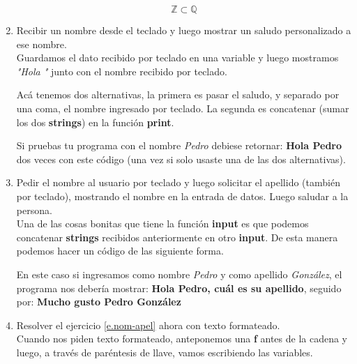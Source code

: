 \begin{enumerate}[{Ejercicio} 1.]
        \[\mathbb{Z} \subset \mathbb{Q} \]

        \item Recibir un nombre desde el teclado y luego mostrar un saludo personalizado a ese nombre. \\
        
        \asw Guardamos el dato recibido por teclado en una variable y luego mostramos \textit{"Hola "} junto con el nombre recibido por teclado.

        Acá tenemos dos alternativas, la primera es pasar el saludo, y separado por una coma, el nombre ingresado por teclado. La segunda es concatenar (sumar los dos \textbf{strings}) en la función \textbf{print}.\\


        Si pruebas tu programa con el nombre \textit{Pedro} debiese retornar: \textbf{Hola Pedro} dos veces con este código (una vez si solo usaste una de las dos alternativas).

        \item Pedir el nombre al usuario por teclado y luego solicitar el apellido (también por teclado), mostrando el nombre en la entrada de datos. Luego saludar a la persona.\label{e.nom-apel}\\
        
        \asw Una de las cosas bonitas que tiene la función \textbf{input} es que podemos concatenar \textbf{strings} recibidos anteriormente en otro \textbf{input}. De esta manera podemos hacer un código de las siguiente forma.\\

        \begin{listing}[H]
        \end{listing}

        En este caso si ingresamos como nombre \textit{Pedro} y como apellido \textit{González}, el programa nos debería mostrar: \textbf{Hola Pedro, cuál es su apellido}, seguido por: \textbf{Mucho gusto Pedro González}

        \item Resolver el ejercicio \ref{e.nom-apel} ahora con texto formateado.\label{e.formato}\\
        
        \asw Cuando nos piden texto formateado, anteponemos una \textbf{f} antes de la cadena y luego, a través de paréntesis de llave, vamos escribiendo las variables.\\


\end{enumerate}
